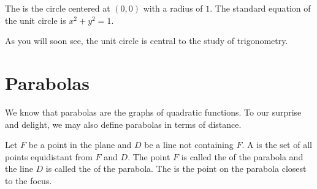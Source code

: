 \documentclass[nooutcomes]{ximera}
\begin{document}
\begin{definition}
\label{UnitCircle}
The   is the circle centered at $(0,0)$ with a radius of $1$.  The standard equation of the unit circle is $x^2 + y^2 = 1.$

\end{definition}

As you will soon see, the unit circle is central to the study of trigonometry.

\section{Parabolas}
We know that parabolas are the graphs of quadratic functions. To our surprise and delight, we may also define parabolas in terms of distance.

\begin{definition}
Let $F$ be a point in the plane and $D$ be a line not containing $F$.   A    is the set of all points equidistant from $F$ and $D$.  The point $F$ is called the    of the parabola and the line $D$ is called the    of the parabola. The    is the point on the parabola closest to the focus.  
\end{definition}
\end{document}
